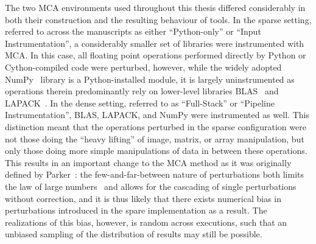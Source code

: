The two MCA environments used throughout this thesis differed considerably in both their construction and the
resulting behaviour of tools. In the sparse setting, referred to across the manuscripts as either ``Python-only''
or ``Input Instrumentation'', a considerably smaller set of libraries were instrumented with MCA. In this case,
all floating point operations performed directly by Python or Cython-compiled code were perturbed, however, while
the widely adopted NumPy~\cite{harris2020array} library is a Python-installed module, it is largely
uninstrumented as operations therein predominantly rely on lower-level libraries BLAS~\cite{lawson1979basic} and
LAPACK~\cite{anderson1999lapack}. In the dense setting, referred to as ``Full-Stack'' or ``Pipeline
Instrumentation'', BLAS, LAPACK, and NumPy were instrumented as well. This distinction meant that the operations
perturbed in the sparse configuration were not those doing the ``heavy lifting'' of image, matrix, or array
manipulation, but only those doing more simple manipulations of data in between these operations. This results in
an important change to the MCA method as it was originally defined by Parker~\cite{Parker1997-qq}: the
few-and-far-between nature of perturbations both limits the law of large numbers~\cite{hsu1947complete} and
allows for the cascading of single perturbations without correction, and it is thus likely that there exists
numerical bias in perturbations introduced in the spare implementation as a result. The realizations of this bias,
however, is random across executions, such that an unbiased sampling of the distribution of results may still be
possible.

